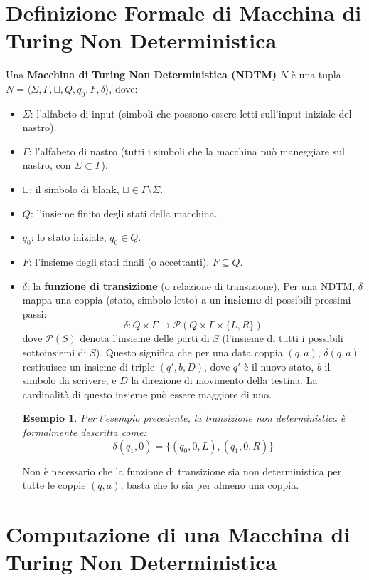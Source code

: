 \documentclass[a4paper, 11pt]{book} %
\newtheorem{example}[theorem]{Esempio}
\theoremstyle{definition}
\begin{document}
\section{Definizione Formale di Macchina di Turing Non Deterministica}

Una \textbf{Macchina di Turing Non Deterministica (NDTM)} $N$ è una tupla $N = \langle \Sigma, \Gamma, \sqcup, Q, q_0, F, \delta \rangle$, dove:
\begin{itemize}
    \item $\Sigma$: l'alfabeto di input (simboli che possono essere letti sull'input iniziale del nastro).
    \item $\Gamma$: l'alfabeto di nastro (tutti i simboli che la macchina può maneggiare sul nastro, con $\Sigma \subset \Gamma$).
    \item $\sqcup$: il simbolo di blank, $\sqcup \in \Gamma \setminus \Sigma$.
    \item $Q$: l'insieme finito degli stati della macchina.
    \item $q_0$: lo stato iniziale, $q_0 \in Q$.
    \item $F$: l'insieme degli stati finali (o accettanti), $F \subseteq Q$.
    \item $\delta$: la \textbf{funzione di transizione} (o relazione di transizione). Per una NDTM, $\delta$ mappa una coppia (stato, simbolo letto) a un \textbf{insieme} di possibili prossimi passi:
    \[ \delta: Q \times \Gamma \to \mathcal{P}(Q \times \Gamma \times \{L, R\}) \]
    dove $\mathcal{P}(S)$ denota l'insieme delle parti di $S$ (l'insieme di tutti i possibili sottoinsiemi di $S$). Questo significa che per una data coppia $(q, a)$, $\delta(q, a)$ restituisce un insieme di triple $(q', b, D)$, dove $q'$ è il nuovo stato, $b$ il simbolo da scrivere, e $D$ la direzione di movimento della testina. La cardinalità di questo insieme può essere maggiore di uno.

    \begin{example}
    Per l'esempio precedente, la transizione non deterministica è formalmente descritta come:
    \[ \delta(q_1, 0) = \{ (q_0, 0, L), (q_1, 0, R) \} \]
    \end{example}
    Non è necessario che la funzione di transizione sia non deterministica per tutte le coppie $(q,a)$; basta che lo sia per almeno una coppia.
\end{itemize}

\section{Computazione di una Macchina di Turing Non Deterministica}
\end{document}
